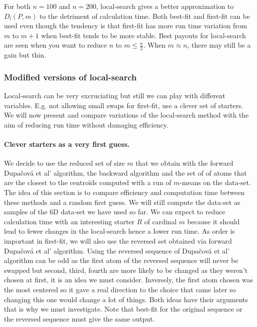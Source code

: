 \documentclass{amsart}
\begin{document}
For both $n=100$ and $n=200$, local-search gives a better approximation to $D_l\left(P,m\right)$ to the detriment of calculation time. Both best-fit and first-fit can be used even though the tendency is that first-fit has more run time variation from $m$ to $m+1$ when best-fit tends to be more stable. Best payouts for local-search are seen when you want to reduce $n$ to $m\leq\frac{n}{2}$. When $m\approx n$, there may still be a gain but thin. 

\subsubsection{Modified versions of local-search}
Local-search can be very excruciating but still we can play with different variables. E.g. not allowing small swaps for first-fit, use a clever set of starters. We will now present and compare variations of the local-search method with the aim of reducing run time without damaging efficiency. 
\paragraph{\textbf{Clever starters as a very first guess.}}
We decide to use the reduced set of size $m$ that we obtain with the forward Dupačová et al' algorithm, the backward algorithm and the set of of atoms that are the closest to the centroïds computed with a run of $m$-means on the data-set. The idea of this section is to compare efficiency and computation time between these methods and a random first guess. We will still compute the data-set as samples of the 6D data-set we have used so far. We can expect to reduce calculation time with an interesting starter $R$ of cardinal $m$ because it should lead to fewer changes in the local-search hence a lower run time. As order is important in first-fit, we will also use the reversed set obtained via forward Dupačová et al' algorithm. Using the reversed sequence of Dupačová et al' algorithm can be odd as the first atom of the reversed sequence will never be swapped but second, third, fourth are more likely to be changed as they weren't chosen at first, it is an idea we must consider. Inversely, the first atom chosen was the most centered so it gave a real direction to the choice that came later so changing this one would change a lot of things. Both ideas have their arguments that is why we must investigate. Note that best-fit for the original sequence or the reversed sequence must give the same output.
\end{document}

